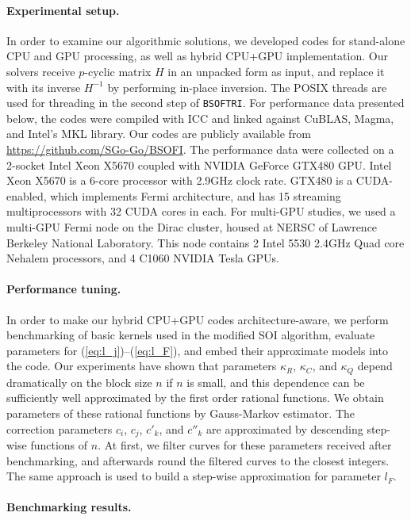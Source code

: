 \documentclass{llncs}
\newcommand{\Blas}{{\sc BLAS}\xspace}
\newcommand{\Cuda}{{\sc CUDA}\xspace}
\newcommand{\CuBlas}{{\sc Cu\Blas}\xspace}
\newcommand{\Magma}{{\sc Magma}\xspace}
\newcommand{\Bsoftri}{\texttt{BSOFTRI}\xspace}
\begin{document}
\paragraph{Experimental setup.}
\label{sec:experimental_setup}
%
In order to examine our algorithmic solutions, 
we developed codes for 
stand-alone CPU and GPU processing, 
as well as hybrid CPU+GPU implementation.
Our solvers receive $p$-cyclic matrix $H$ in an unpacked form as input, 
and replace it with its inverse $H^{-1}$ 
by performing in-place inversion. 
The POSIX threads are used for threading in the second step of \Bsoftri.
For performance data presented below, 
the codes were compiled with ICC
and linked against \CuBlas, \Magma, and Intel's MKL library.
Our codes are publicly available from
\url{https://github.com/SGo-Go/BSOFI}.
The performance data were collected on a 2-socket Intel Xeon X5670 
coupled with NVIDIA GeForce GTX480 GPU.
Intel Xeon X5670 is a 6-core processor with 2.9GHz clock rate.
GTX480 is a \Cuda-enabled, which implements Fermi architecture, 
and has 15 streaming multiprocessors with 32 \Cuda cores in each.
For multi-GPU studies, we used a multi-GPU Fermi node on the Dirac cluster,
housed at NERSC of Lawrence Berkeley National Laboratory.
This node contains 2 Intel 5530 2.4GHz Quad core Nehalem processors, 
and 4 C1060 NVIDIA Tesla GPUs.

\paragraph{Performance tuning.}
\label{sec:BB_performance}
%
In order to make our hybrid CPU+GPU codes architecture-aware, 
we perform benchmarking of basic kernels used in the modified SOI algorithm, 
evaluate parameters for (\ref{eq:l_j})--(\ref{eq:l_F}), 
and embed their approximate models into the code.
Our experiments have shown that 
parameters $\kappa_R$, $\kappa_C$, and $\kappa_Q$ 
depend dramatically on the block size $n$ if $n$ is small, and
this dependence can be sufficiently well
approximated by the first order rational functions. 
We obtain parameters of these rational functions 
by Gauss-Markov estimator. 
The correction parameters $c_i$, $c_j$, $c'_k$, and $c''_k$
are approximated by descending step-wise functions of $n$.
At first, we filter curves for these parameters received after benchmarking, 
and afterwards round the filtered curves to the closest integers.
The same approach is used to build a step-wise approximation for parameter $l_F$.

\paragraph{Benchmarking results.}
\label{sec:benchmarking}
\end{document}
